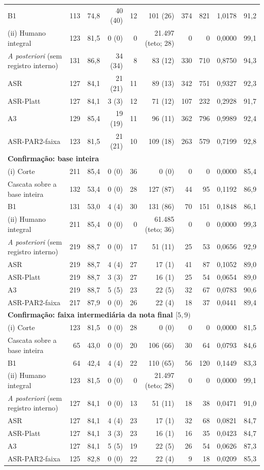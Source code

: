 \begin{longtable}{lrrrrrrrrr}
B1 & 113 & 74,8 & 40 (40) & 12 & 101 (26) & 374 & 821 & 1,0178 & 91,2 \\
(ii) Humano integral & 123 & 81,5 & 0 (0) & 0 & 21.497 (teto; 28) & 0 & 0 & 0,0000 & 99,1 \\
\textit{A posteriori} (sem registro interno) & 131 & 86,8 & 34 (34) & 8 & 83 (12) & 330 & 710 & 0,8750 & 94,3 \\
ASR & 127 & 84,1 & 21 (21) & 11 & 89 (13) & 342 & 751 & 0,9327 & 92,3 \\
ASR-Platt & 127 & 84,1 & 3 (3) & 12 & 71 (12) & 107 & 232 & 0,2928 & 91,7 \\
A3 & 129 & 85,4 & 19 (19) & 11 & 96 (11) & 362 & 796 & 0,9989 & 92,4 \\
ASR-PAR2-faixa & 123 & 81,5 & 21 (21) & 10 & 109 (18) & 263 & 579 & 0,7199 & 92,8 \\
\midrule
\multicolumn{10}{l}{\textbf{Confirmação: base inteira}} \\
(i) Corte & 211 & 85,4 & 0 (0) & 36 & 0 (0) & 0 & 0 & 0,0000 & 85,4 \\
Cascata sobre a base inteira & 132 & 53,4 & 0 (0) & 28 & 127 (87) & 44 & 95 & 0,1192 & 86,9 \\
B1 & 131 & 53,0 & 4 (4) & 30 & 131 (86) & 70 & 151 & 0,1848 & 86,1 \\
(ii) Humano integral & 211 & 85,4 & 0 (0) & 0 & 61.485 (teto; 36) & 0 & 0 & 0,0000 & 99,3 \\
\textit{A posteriori} (sem registro interno) & 219 & 88,7 & 0 (0) & 17 & 51 (11) & 25 & 53 & 0,0656 & 92,9 \\
ASR & 219 & 88,7 & 4 (4) & 27 & 17 (1) & 41 & 87 & 0,1052 & 89,0 \\
ASR-Platt & 219 & 88,7 & 3 (3) & 27 & 16 (1) & 25 & 54 & 0,0654 & 89,0 \\
A3 & 219 & 88,7 & 5 (5) & 23 & 22 (5) & 32 & 67 & 0,0783 & 90,6 \\
ASR-PAR2-faixa & 217 & 87,9 & 0 (0) & 26 & 22 (4) & 18 & 37 & 0,0441 & 89,4 \\
\midrule
\multicolumn{10}{l}{\textbf{Confirmação: faixa intermediária da nota final $[5,9)$}} \\
(i) Corte & 123 & 81,5 & 0 (0) & 28 & 0 (0) & 0 & 0 & 0,0000 & 81,5 \\
Cascata sobre a base inteira & 65 & 43,0 & 0 (0) & 20 & 106 (66) & 30 & 64 & 0,0793 & 84,6 \\
B1 & 64 & 42,4 & 4 (4) & 22 & 110 (65) & 56 & 120 & 0,1449 & 83,3 \\
(ii) Humano integral & 123 & 81,5 & 0 (0) & 0 & 21.497 (teto; 28) & 0 & 0 & 0,0000 & 99,1 \\
\textit{A posteriori} (sem registro interno) & 127 & 84,1 & 0 (0) & 13 & 51 (11) & 18 & 38 & 0,0471 & 91,0 \\
ASR & 127 & 84,1 & 4 (4) & 23 & 17 (1) & 32 & 68 & 0,0821 & 84,7 \\
ASR-Platt & 127 & 84,1 & 3 (3) & 23 & 16 (1) & 16 & 35 & 0,0423 & 84,7 \\
A3 & 127 & 84,1 & 5 (5) & 19 & 22 (5) & 26 & 54 & 0,0626 & 87,3 \\
ASR-PAR2-faixa & 125 & 82,8 & 0 (0) & 22 & 22 (4) & 9 & 18 & 0,0209 & 85,3 \\
\end{longtable}
